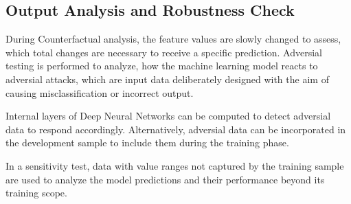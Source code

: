 \subsection{Output Analysis and Robustness Check}
During Counterfactual analysis, the feature values are slowly changed to assess, which total changes are necessary to receive a specific prediction. Adversial testing is performed to analyze, how the machine learning model reacts to adversial attacks, which are input data deliberately designed with the aim of causing misclassification or incorrect output. 

Internal layers of Deep Neural Networks can be computed to detect adversial data to respond accordingly. Alternatively, adversial data can be incorporated in the development sample to include them during the training phase. 

In a sensitivity test, data with value ranges not captured by the training sample are used to analyze the model predictions and their performance beyond its training scope. \cite[p.~65-67]{Roberts2022}
